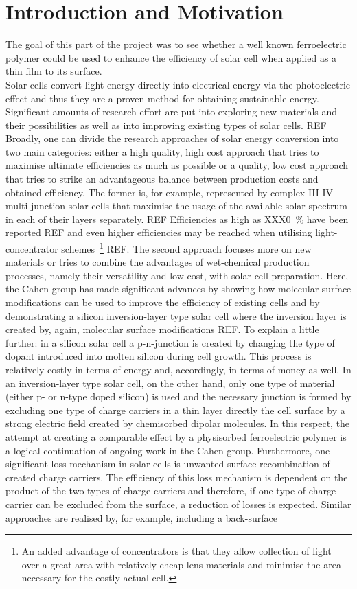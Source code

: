 \section{Introduction and Motivation}
The goal of this part of the project was to see whether a well known ferroelectric polymer could be used to enhance the efficiency of solar cell when applied as a thin film to its surface.\\
Solar cells convert light energy directly into electrical energy via the photoelectric effect and thus they are a proven method for obtaining sustainable energy. Significant amounts of research effort are put into exploring new materials and their possibilities as well as into improving existing types of solar cells. REF Broadly, one can divide the research approaches of solar energy conversion into two main categories: either a high quality, high cost approach that tries to maximise ultimate efficiencies as much as possible or a  quality, low cost approach that tries to strike an advantageous balance between production costs and obtained efficiency. The former is, for example, represented by complex III-IV multi-junction solar cells that maximise the usage of the available solar spectrum in each of their layers separately. REF Efficiencies as high as XXX\SI{0}{\percent} have been reported REF and even higher efficiencies may be reached when utilising light-concentrator schemes~\footnote{An added advantage of concentrators is that they allow collection of light over a great area with relatively cheap lens materials and minimise the area necessary for the costly actual cell.} REF. The second approach focuses more on new materials or tries to combine the advantages of wet-chemical production processes, namely their versatility and low cost, with solar cell preparation. Here, the Cahen group has made significant advances by showing how molecular surface modifications can be used to improve the efficiency of existing cells and by demonstrating a silicon inversion-layer type solar cell where the inversion layer is created by, again, molecular surface modifications REF. To explain a little further: in a  silicon solar cell a p-n-junction is created by changing the type of dopant introduced into molten silicon during cell growth. This process is relatively costly in terms of energy and, accordingly, in terms of money as well. In an inversion-layer type solar cell, on the other hand, only one type of material (either p- or n-type doped silicon) is used and the necessary junction is formed by excluding one type of charge carriers in a thin layer directly the cell surface by a strong electric field created by chemisorbed dipolar molecules. In this respect, the attempt at creating a comparable effect by a physisorbed ferroelectric polymer is a logical continuation of ongoing work in the Cahen group. Furthermore, one significant loss mechanism in solar cells is unwanted surface recombination of created charge carriers. The efficiency of this loss mechanism is dependent on the product of the two types of charge carriers and therefore, if one type of charge carrier can be excluded from the surface, a reduction of losses is expected. Similar approaches are realised by, for example, including a back-surface 